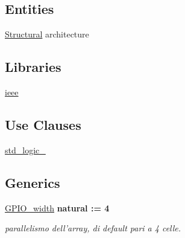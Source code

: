 \subsection*{Entities}
\begin{DoxyCompactItemize}
\item 
\hyperlink{class_g_p_i_oarray_1_1_structural}{Structural} architecture
\end{DoxyCompactItemize}
\subsection*{Libraries}
 \begin{DoxyCompactItemize}
\item 
\hypertarget{class_g_p_i_oarray_ga0a6af6eef40212dbaf130d57ce711256}{\hyperlink{group__my_g_p_i_o_ga0a6af6eef40212dbaf130d57ce711256}{ieee} }\label{class_g_p_i_oarray_ga0a6af6eef40212dbaf130d57ce711256}

\end{DoxyCompactItemize}
\subsection*{Use Clauses}
 \begin{DoxyCompactItemize}
\item 
\hypertarget{class_g_p_i_oarray_gacd03516902501cd1c7296a98e22c6fcb}{\hyperlink{group__my_g_p_i_o_gacd03516902501cd1c7296a98e22c6fcb}{std\+\_\+logic\+\_}   }\label{class_g_p_i_oarray_gacd03516902501cd1c7296a98e22c6fcb}

\end{DoxyCompactItemize}
\subsection*{Generics}
 \begin{DoxyCompactItemize}
\item 
\hypertarget{class_g_p_i_oarray_ga0b52ca75e9a6093b2b60d5e851803069}{\hyperlink{group__my_g_p_i_o_ga0b52ca75e9a6093b2b60d5e851803069}{G\+P\+I\+O\+\_\+width} {\bfseries {\bfseries \textcolor{vhdlchar}{natural}\textcolor{vhdlchar}{ }\textcolor{vhdlchar}{ }\textcolor{vhdlchar}{\+:}\textcolor{vhdlchar}{=}\textcolor{vhdlchar}{ }\textcolor{vhdlchar}{ } \textcolor{vhdldigit}{4} \textcolor{vhdlchar}{ }}}}\label{class_g_p_i_oarray_ga0b52ca75e9a6093b2b60d5e851803069}

\begin{DoxyCompactList}\small\item\em parallelismo dell'array, di default pari a 4 celle. \end{DoxyCompactList}\end{DoxyCompactItemize}
